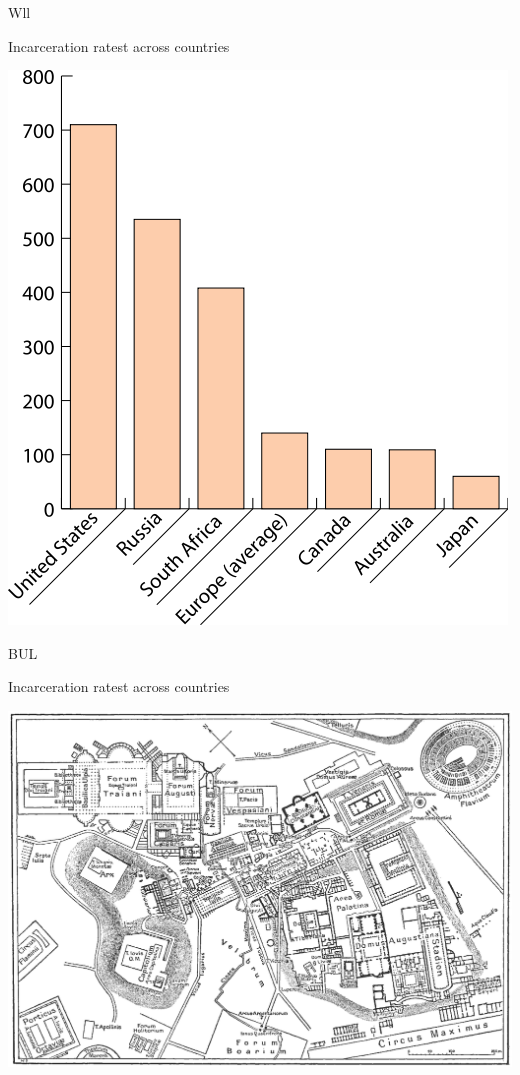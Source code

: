 \begin{map}{W}{ll}
\caption{Incarceration ratest across countries}
\label{chart:incarceration}
\includegraphics[width=\chartwidth,height=\chartheight]{incarceration}  
\end{map}

\lipsum[1-2]

\begin{map}{B}{UL}
\caption{Incarceration ratest across countries}
\label{chart:incarceration}
\includegraphics[width=\chartwidth,height=\chartheight]{Rome}  
\end{map}
%

